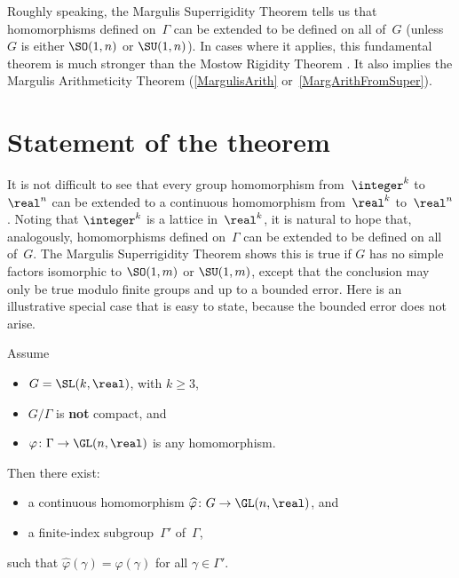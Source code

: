 

\label{MargulisSuperChap}



Roughly speaking, the Margulis Superrigidity Theorem tells us that homomorphisms defined on~$\Gamma$ can be extended to be defined on all of~$G$ (unless $G$ is either $\SO(1,n)$ or $\SU(1,n)$). 
In cases where it applies, this fundamental theorem is much stronger than the Mostow Rigidity Theorem .
It also implies the Margulis Arithmeticity Theorem (\ref{MargulisArith} or~\ref{MargArithFromSuper}).


\section{Statement of the theorem} \label{MargSuperStatementSect}

It is not difficult to see that every group homomorphism from~$\integer^k$ to~$\real^n$ can be extended to a continuous homomorphism from~$\real^k$ to~$\real^n$ . Noting that $\integer^k$ is a lattice in~$\real^k$, it is natural to hope that, analogously, homomorphisms defined on~$\Gamma$ can be extended to be defined on all of~$G$. The Margulis Superrigidity Theorem shows this is true if $G$ has no simple factors isomorphic to $\SO(1,m)$ or $\SU(1,m)$, except that the conclusion may only be true modulo finite groups and up to a bounded error. Here is an illustrative special case that is easy to state, because the bounded error does not arise. 

\begin{thm}[(Margulis)] \label{MargSuperSL3RNonCpct}
Assume
\noprelistbreak
	\begin{itemize}
	\item $G = \SL(k,\real)$, with $k \ge 3$,
	\item $G/\Gamma$ is \textbf{not} compact,
	and
	\item $\varphi \colon \Gamma \to \GL(n,\real)$ is any homomorphism.
	\end{itemize}
Then there exist:
\noprelistbreak
	\begin{itemize}
	\item a continuous homomorphism $\widehat\varphi \colon G \to \GL(n,\real)$, 
	and
	\item a finite-index subgroup~$\Gamma'$ of~$\Gamma$,
	\end{itemize}
such that  $\widehat\varphi(\gamma) = \varphi(\gamma)$ for all $\gamma \in \Gamma'$.
\end{thm}


